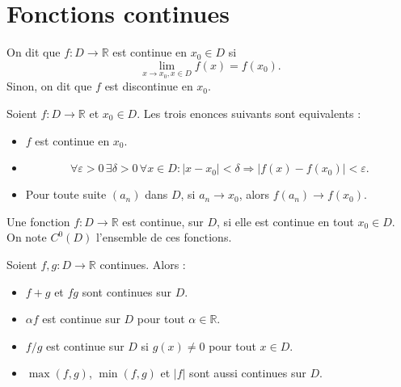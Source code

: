 \section{Fonctions continues}
\begin{definition}
On dit que $f:D\to \mathbb{R}$ est continue en $x_{0}\in D$ si 
$$
\lim_{ x \to x_{0},x \in D } f(x)=f(x_{0}).
$$
Sinon, on dit que $f$ est discontinue en $x_{0}$.
\end{definition}
\begin{theorem}
Soient $f:D\to \mathbb{R}$ et $x_{0}\in D$. Les trois enonces suivants sont equivalents :
\begin{itemize}
\item $f$ est continue en $x_{0}$.
\item 
$$
\forall\varepsilon>0\,\exists\delta>0\,\forall x \in D:|x-x_{0}|<\delta \Rightarrow |f(x)-f(x_{0})|<\varepsilon.
$$
\item Pour toute suite $(a_{n})$ dans $D$, si $a_{n}\to x_{0}$, alors $f(a_{n})\to f(x_{0})$.
\end{itemize}
\end{theorem}
\begin{definition}
Une fonction $f:D\to \mathbb{R}$ est continue, sur $D$, si elle est continue en tout $x_{0}\in D$. On note $C^{0}(D)$ l'ensemble de ces fonctions. 
\end{definition}
\begin{remark}
Soient $f,g:D\to \mathbb{R}$ continues. Alors :
\begin{itemize}
\item $f+g$ et $fg$ sont continues sur $D$.
\item $\alpha f$ est continue sur $D$ pour tout $\alpha \in \mathbb{R}$.
\item $f/g$ est continue sur $D$ si $g(x)\neq 0$ pour tout $x \in D$.
\item $\max (f,g)$, $\min (f,g)$ et $|f|$ sont aussi continues sur $D$.
\end{itemize}
\end{remark}

